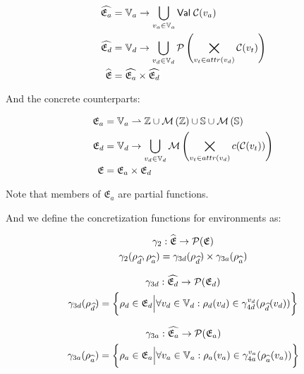 \begin{align} \label{eq:absenva}
    \ab{\mathfrak{E}_a} &= \mathbb{V}_a \rightarrow \bigcup_{v_a \in \mathbb{V}_a} \mathsf{Val} \; \lookupcl(v_a) \\ \label{eq:absenvd}
    \ab{\mathfrak{E}_d} &= \mathbb{V}_d \rightarrow \bigcup_{v_d \in \mathbb{V}_d} \mathcal{P}\left(\bigtimes_{v_t \in attr(v_d)}\lookupcl(v_t)\right) \\
    \ab{\mathfrak{E}} &= \ab{\mathfrak{E}_a} \times \ab{\mathfrak{E}_d}
\end{align}


And the concrete counterparts:


\begin{align}
    \mathfrak{E}_a &= \mathbb{V}_a \rightharpoonup \mathbb{Z} \cup \mathcal{M}\left(\mathbb{Z}\right) \cup \mathbb{S} \cup \mathcal{M}\left(\mathbb{S}\right) \\
    \mathfrak{E}_d &= \mathbb{V}_d \rightarrow \bigcup_{v_d \in \mathbb{V}_d} \mathcal{M}\left(\bigtimes_{v_t \in attr(v_d)}c(\mathcal{C}(v_t))\right) \\
    \mathfrak{E} &= \mathfrak{E}_a \times \mathfrak{E}_d
\end{align}

Note that members of $\mathfrak{E}_a$ are partial functions.

And we define the concretization functions for environments as:


\begin{gather}
    \gamma_2 : \widehat{\mathfrak{E}} \rightarrow \mathcal{P}(\mathfrak{E})\\
    \gamma_2(\rho_{\widehat{d}}, \rho_{\widehat{a}}) = \gamma_{3d}(\rho_{\widehat{d}}) \times \gamma_{3a}(\rho_{\widehat{a}})
\end{gather}


\begin{gather}
    \gamma_{3d} : \widehat{\mathfrak{E}_d} \rightarrow \mathcal{P}(\mathfrak{E}_d)\\
    \gamma_{3d}(\rho_{\widehat{d}}) = \biggl\{ \rho_{d} \in \mathfrak{E}_d \Big| \forall v_d \in \mathbb{V}_d : \rho_d(v_d) \in \gamma^{v_d}_{4d}(\rho_{\widehat{d}}(v_d)) \biggr\}
\end{gather}


\begin{gather}
    \gamma_{3a} : \widehat{\mathfrak{E}_a} \rightarrow \mathcal{P}(\mathfrak{E}_a)\\
    \gamma_{3a}(\rho_{\widehat{a}}) = \biggl\{ \rho_{a} \in \mathfrak{E}_a \Big| \forall v_a \in \mathbb{V}_a : \rho_a(v_a) \in \gamma^{v_a}_{4a}(\rho_{\widehat{a}}(v_a)) \biggr\}
\end{gather}


